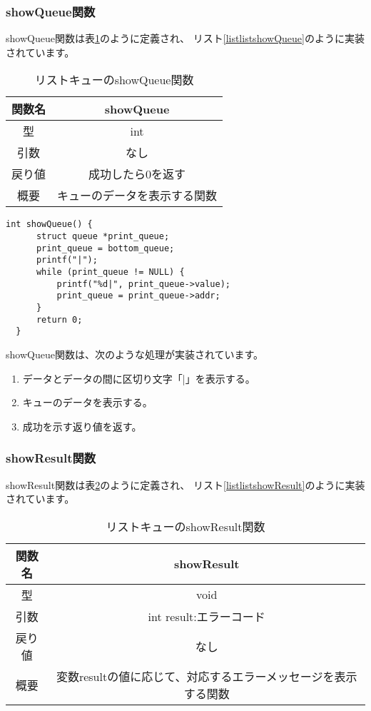 \documentclass[a4j]{jarticle}
\begin{document}
\subsubsection{showQueue関数}
showQueue関数は表\ref{table:listshowQueue}のように定義され、
リスト\ref{listlistshowQueue}のように実装されています。

\begin{table}[htbp]
  \centering
  \caption{リストキューのshowQueue関数}
  \label{table:listshowQueue}
  \begin{tabular}{|c|c|}
    \hline
    関数名 & showQueue      \\
    \hline
    型   & int            \\
    \hline
    引数  & なし             \\
    \hline
    戻り値 & 成功したら0を返す      \\
    \hline
    概要  & キューのデータを表示する関数 \\
    \hline
  \end{tabular}
\end{table}

\begin{lstlisting}[caption=リストキューのshowQueue関数の実装,label=listlistshowQueue]
  int showQueue() {
      struct queue *print_queue;
      print_queue = bottom_queue;
      printf("|");
      while (print_queue != NULL) {
          printf("%d|", print_queue->value);
          print_queue = print_queue->addr;
      }
      return 0;
  }
\end{lstlisting}

showQueue関数は、次のような処理が実装されています。
\begin{enumerate}
  \item データとデータの間に区切り文字「|」を表示する。
  \item キューのデータを表示する。
  \item 成功を示す返り値を返す。
\end{enumerate}

\subsubsection{showResult関数}
showResult関数は表\ref{table:listshowResult}のように定義され、
リスト\ref{listlistshowResult}のように実装されています。

\begin{table}[htbp]
  \centering
  \caption{リストキューのshowResult関数}
  \label{table:listshowResult}
  \begin{tabular}{|c|c|}
    \hline
    関数名 & showResult                         \\
    \hline
    型   & void                               \\
    \hline
    引数  & int result:エラーコード                  \\
    \hline
    戻り値 & なし                                 \\
    \hline
    概要  & 変数resultの値に応じて、対応するエラーメッセージを表示する関数 \\
    \hline
  \end{tabular}
\end{table}
\end{document}

